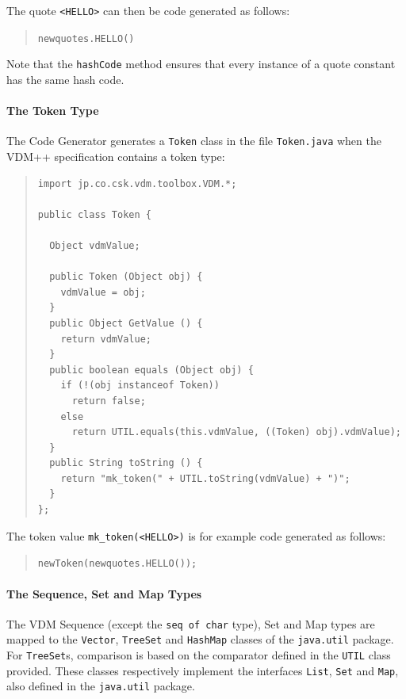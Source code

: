 \documentclass[\pformat,11pt]{article}
\newcommand{\Tcg}{The Code Generator}
\begin{document}
The quote \verb+<HELLO>+ can then be code generated as follows:
\begin{quote}
\begin{alltt}
new quotes.HELLO()
\end{alltt}
\end{quote}
Note that the \texttt{hashCode} method ensures that every instance of
a quote constant has the same hash code.

\paragraph{The Token Type}

 \Tcg{} generates a \verb+Token+ class in the file
  \verb+Token.java+ when the VDM++ specification contains a
  token type:


\begin{quote}
\begin{small}  
\begin{verbatim}
import jp.co.csk.vdm.toolbox.VDM.*;

public class Token {

  Object vdmValue;

  public Token (Object obj) {
    vdmValue = obj;
  }
  public Object GetValue () {
    return vdmValue;
  }
  public boolean equals (Object obj) {
    if (!(obj instanceof Token)) 
      return false;
    else 
      return UTIL.equals(this.vdmValue, ((Token) obj).vdmValue);
  }
  public String toString () {
    return "mk_token(" + UTIL.toString(vdmValue) + ")";
  }
};
\end{verbatim}  
\end{small}  
\end{quote}

The token value \verb+mk_token(<HELLO>)+ is for example code generated as follows:

\begin{quote}
\begin{alltt}
new Token(new quotes.HELLO());
\end{alltt}
\end{quote}

\paragraph{The Sequence, Set and Map Types}

The VDM Sequence (except the {\tt seq of char} type), Set and Map
types are mapped to the \texttt{Vector}, \texttt{TreeSet} and
\texttt{HashMap} classes of the \texttt{java.util} package. For
\texttt{TreeSet}s, comparison is based on the comparator defined in the
\texttt{UTIL} class provided. These classes respectively implement the 
interfaces \texttt{List}, \texttt{Set} and \texttt{Map}, also
defined in the \texttt{java.util} package.
\end{document}
